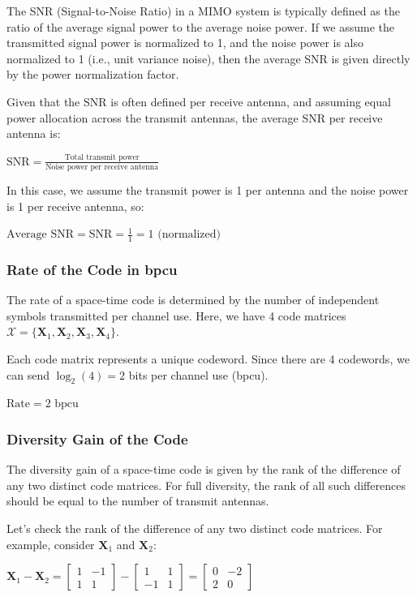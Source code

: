 \documentclass[11pt]{article}
\begin{document}
The SNR (Signal-to-Noise Ratio) in a MIMO system is typically defined as
the ratio of the average signal power to the average noise power. If we
assume the transmitted signal power is normalized to 1, and the noise
power is also normalized to 1 (i.e., unit variance noise), then the
average SNR is given directly by the power normalization factor.

Given that the SNR is often defined per receive antenna, and assuming
equal power allocation across the transmit antennas, the average SNR per
receive antenna is:

\(\text{SNR} = \frac{\text{Total transmit power}}{\text{Noise power per receive antenna}}\)

In this case, we assume the transmit power is 1 per antenna and the
noise power is 1 per receive antenna, so:

\(\text{Average SNR} = \text{SNR} = \frac{1}{1} = 1 \text{ (normalized)}\)

\subsubsection{Rate of the Code in bpcu}\label{rate-of-the-code-in-bpcu}

The rate of a space-time code is determined by the number of independent
symbols transmitted per channel use. Here, we have 4 code matrices
\(\mathcal{X} = \{\mathbf{X}_1, \mathbf{X}_2, \mathbf{X}_3, \mathbf{X}_4\}\).

Each code matrix represents a unique codeword. Since there are 4
codewords, we can send \(\log_2(4) = 2\) bits per channel use (bpcu).

\(\text{Rate} = 2 \text{ bpcu}\)

\subsubsection{Diversity Gain of the
Code}\label{diversity-gain-of-the-code}

The diversity gain of a space-time code is given by the rank of the
difference of any two distinct code matrices. For full diversity, the
rank of all such differences should be equal to the number of transmit
antennas.

Let's check the rank of the difference of any two distinct code
matrices. For example, consider \(\mathbf{X}_1\) and \(\mathbf{X}_2\):

\(\mathbf{X}_1 - \mathbf{X}_2 = \begin{bmatrix} 1 & -1 \\ 1 & 1 \end{bmatrix} - \begin{bmatrix} 1 & 1 \\ -1 & 1 \end{bmatrix} = \begin{bmatrix} 0 & -2 \\ 2 & 0 \end{bmatrix}\)
\end{document}
